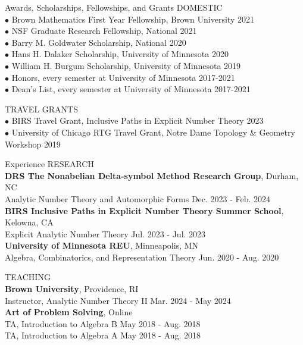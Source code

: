 \documentclass{resume} %
\begin{document}
\begin{rSection}{Awards, Scholarships, Fellowships, and Grants}
DOMESTIC \\
{$\bullet$ Brown Mathematics First Year Fellowship, Brown University} \hfill {2021} \\
{$\bullet$ NSF Graduate Research Fellowship, National} \hfill {2021} \\
{$\bullet$ Barry M. Goldwater Scholarship, National} \hfill {2020} \\
{$\bullet$ Hans H. Dalaker Scholarship, University of Minnesota} \hfill {2020} \\
{$\bullet$ William H. Burgum Scholarship, University of Minnesota} \hfill {2019} \\
{$\bullet$ Honors, every semester at University of Minnesota} \hfill {2017-2021} \\
{$\bullet$ Dean's List, every semester at University of Minnesota} \hfill {2017-2021}

TRAVEL GRANTS \\
{$\bullet$ BIRS Travel Grant, Inclusive Paths in Explicit Number Theory} \hfill {2023} \\
{$\bullet$ University of Chicago RTG Travel Grant, Notre Dame Topology \& Geometry Workshop} \hfill {2019} 
\end{rSection}

\begin{rSection}{Experience}
RESEARCH \\
{\bf DRS The Nonabelian Delta-symbol Method Research Group}, Durham, NC \\
\hphantom{\quad} Analytic Number Theory and Automorphic Forms \hfill {Dec. 2023 - Feb. 2024} \\
{\bf BIRS Inclusive Paths in Explicit Number Theory Summer School}, Kelowna, CA \\
\hphantom{\quad} Explicit Analytic Number Theory \hfill {Jul. 2023 - Jul. 2023} \\
{\bf University of Minnesota REU}, Minneapolis, MN \\
\hphantom{\quad} Algebra, Combinatorics, and Representation Theory \hfill {Jun. 2020 - Aug. 2020}

TEACHING \\
{\bf Brown University}, Providence, RI \\
\hphantom{\quad} Instructor, Analytic Number Theory II \hfill {Mar. 2024 - May 2024} \\
{\bf Art of Problem Solving}, Online \\
\hphantom{\quad} TA, Introduction to Algebra B \hfill {May 2018 - Aug. 2018} \\
\hphantom{\quad} TA, Introduction to Algebra A \hfill {May 2018 - Aug. 2018} \\
\end{rSection}
\end{document}
